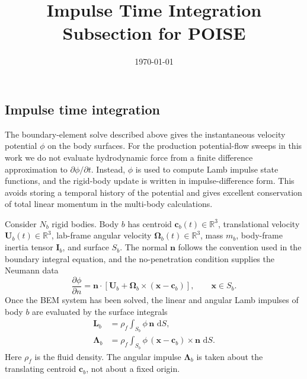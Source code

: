 \documentclass[11pt,a4paper]{article}
\title{Impulse Time Integration Subsection for POISE}
\author{}
\date{\today}
\newcommand{\dd}{\,\mathrm{d}}
\newcommand{\R}{\mathbb{R}}
\newcommand{\bx}{\bm{x}}
\newcommand{\bc}{\bm{c}}
\newcommand{\bn}{\bm{n}}
\newcommand{\bU}{\bm{U}}
\newcommand{\bOmega}{\bm{\Omega}}
\newcommand{\bI}{\bm{I}}
\newcommand{\bL}{\bm{L}}
\newcommand{\bLambda}{\bm{\Lambda}}
\begin{document}
\maketitle
\setcounter{section}{3}
\setcounter{subsection}{2}

\subsection{Impulse time integration}
\label{sec:impulse-time-integration}

The boundary-element solve described above gives the instantaneous velocity
potential $\phi$ on the body surfaces.  For the production potential-flow
sweeps in this work we do not evaluate hydrodynamic force from a finite
difference approximation to $\partial\phi/\partial t$.  Instead, $\phi$ is used
to compute Lamb impulse state functions, and the rigid-body update is written
in impulse-difference form.  This avoids storing a temporal history of the
potential and gives excellent conservation of total linear momentum in the
multi-body calculations.

Consider $N_b$ rigid bodies.  Body $b$ has centroid $\bc_b(t)\in\R^3$,
translational velocity $\bU_b(t)\in\R^3$, lab-frame angular velocity
$\bOmega_b(t)\in\R^3$, mass $m_b$, body-frame inertia tensor $\bI_b$, and
surface $S_b$.  The normal $\bn$ follows the convention used in the boundary
integral equation, and the no-penetration condition supplies the Neumann data
\begin{equation}
  \frac{\partial \phi}{\partial n}
  =
  \bn\cdot
  \left[
    \bU_b+\bOmega_b\times(\bx-\bc_b)
  \right],
  \qquad \bx\in S_b .
  \label{eq:impulse-neumann}
\end{equation}
Once the BEM system has been solved, the linear and angular Lamb impulses of
body $b$ are evaluated by the surface integrals
\begin{align}
  \bL_b
  &=
  \rho_f\int_{S_b}\phi\,\bn\,\dd S,
  \label{eq:linear-lamb-impulse}\\
  \bLambda_b
  &=
  \rho_f\int_{S_b}
    \phi\,(\bx-\bc_b)\times\bn\,\dd S .
  \label{eq:angular-lamb-impulse}
\end{align}
Here $\rho_f$ is the fluid density.  The angular impulse
$\bLambda_b$ is taken about the translating centroid $\bc_b$, not about a fixed
origin.
\end{document}
